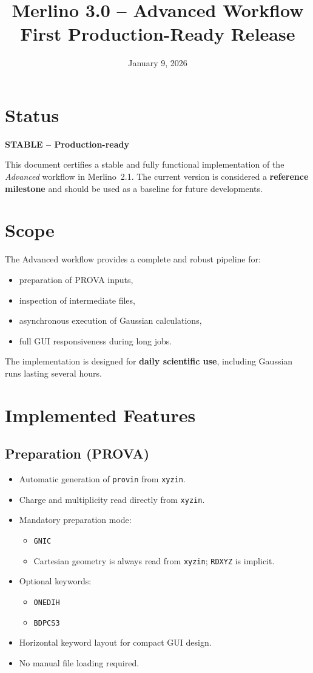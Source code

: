 \documentclass[11pt,a4paper]{article}
\title{\textbf{Merlino 3.0 -- Advanced Workflow}\\
\vspace{0.3cm}
\large First Production-Ready Release}
\author{}
\date{January 9, 2026}
\begin{document}
\maketitle

\section*{Status}
\textbf{STABLE -- Production-ready}

This document certifies a stable and fully functional implementation of the
\emph{Advanced} workflow in Merlino~2.1.
The current version is considered a \textbf{reference milestone} and should be
used as a baseline for future developments.

\section*{Scope}
The Advanced workflow provides a complete and robust pipeline for:
\begin{itemize}[nosep]
  \item preparation of PROVA inputs,
  \item inspection of intermediate files,
  \item asynchronous execution of Gaussian calculations,
  \item full GUI responsiveness during long jobs.
\end{itemize}

The implementation is designed for \textbf{daily scientific use}, including
Gaussian runs lasting several hours.

\section*{Implemented Features}

\subsection*{Preparation (PROVA)}
\begin{itemize}[nosep]
  \item Automatic generation of \texttt{provin} from \texttt{xyzin}.
  \item Charge and multiplicity read directly from \texttt{xyzin}.
  \item Mandatory preparation mode:
    \begin{itemize}[nosep]
      \item \texttt{GNIC}
      \item Cartesian geometry is always read from \texttt{xyzin}; \texttt{RDXYZ} is implicit.
    \end{itemize}
  \item Optional keywords:
    \begin{itemize}[nosep]
      \item \texttt{ONEDIH}
      \item \texttt{BDPCS3}
    \end{itemize}
  \item Horizontal keyword layout for compact GUI design.
  \item No manual file loading required.
\end{itemize}
\end{document}
